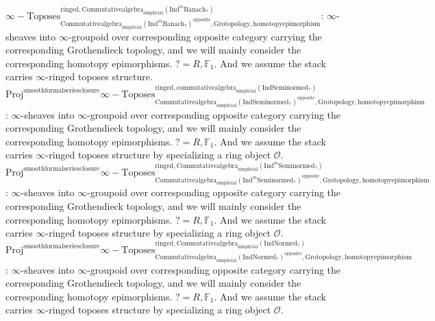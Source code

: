 \documentclass[11pt]{book}
\theoremstyle{definition}
\numberwithin{equation}{section}
\begin{document}
\noindent $\infty-\mathrm{Toposes}^{\mathrm{ringed},\mathrm{Commutativealgebra}_{\mathrm{simplicial}}(\mathrm{Ind}^m\mathrm{Banach}_?)}_{\mathrm{Commutativealgebra}_{\mathrm{simplicial}}(\mathrm{Ind}^m\mathrm{Banach}_?)^\mathrm{opposite},\mathrm{Grotopology,homotopyepimorphism}}$: $\infty$-sheaves into $\infty$-groupoid over corresponding opposite category carrying the corresponding Grothendieck topology, and we will mainly consider the corresponding homotopy epimorphisms. $?=R,\mathbb{F}_1$. And we assume the stack carries $\infty$-ringed toposes structure.\\ 
 
 
 \noindent $\mathrm{Proj}^\text{smoothformalseriesclosure}\infty-\mathrm{Toposes}^{\mathrm{ringed},\mathrm{commutativealgebra}_{\mathrm{simplicial}}(\mathrm{Ind}\mathrm{Seminormed}_?)}_{\mathrm{Commutativealgebra}_{\mathrm{simplicial}}(\mathrm{Ind}\mathrm{Seminormed}_?)^\mathrm{opposite},\mathrm{Grotopology,homotopyepimorphism}}$: $\infty$-sheaves into $\infty$-groupoid over corresponding opposite category carrying the corresponding Grothendieck topology, and we will mainly consider the corresponding homotopy epimorphisms. $?=R,\mathbb{F}_1$. And we assume the stack carries $\infty$-ringed toposes structure by specializing a ring object $\mathcal{O}$. \\
\noindent $\mathrm{Proj}^\text{smoothformalseriesclosure}\infty-\mathrm{Toposes}^{\mathrm{ringed},\mathrm{Commutativealgebra}_{\mathrm{simplicial}}(\mathrm{Ind}^m\mathrm{Seminormed}_?)}_{\mathrm{Commutativealgebra}_{\mathrm{simplicial}}(\mathrm{Ind}^m\mathrm{Seminormed}_?)^\mathrm{opposite},\mathrm{Grotopology,homotopyepimorphism}}$: $\infty$-sheaves into $\infty$-groupoid over corresponding opposite category carrying the corresponding Grothendieck topology, and we will mainly consider the corresponding homotopy epimorphisms. $?=R,\mathbb{F}_1$. And we assume the stack carries $\infty$-ringed toposes structure by specializing a ring object $\mathcal{O}$.\\
\noindent $\mathrm{Proj}^\text{smoothformalseriesclosure}\infty-\mathrm{Toposes}^{\mathrm{ringed},\mathrm{Commutativealgebra}_{\mathrm{simplicial}}(\mathrm{Ind}\mathrm{Normed}_?)}_{\mathrm{Commutativealgebra}_{\mathrm{simplicial}}(\mathrm{Ind}\mathrm{Normed}_?)^\mathrm{opposite},\mathrm{Grotopology,homotopyepimorphism}}$: $\infty$-sheaves into $\infty$-groupoid over corresponding opposite category carrying the corresponding Grothendieck topology, and we will mainly consider the corresponding homotopy epimorphisms. $?=R,\mathbb{F}_1$. And we assume the stack carries $\infty$-ringed toposes structure by specializing a ring object $\mathcal{O}$.\\
\end{document}
